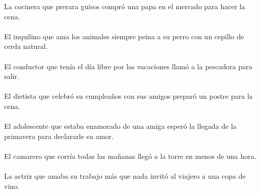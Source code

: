 La cocinera que prerara guisos compró una papa en el mercado para hacer la cena.	\\	\\
El inquilino que ama los animales siempre peina a su perro con un cepillo de cerda natural.	\\	\\
El conductor que tenía el día libre por las vacaciones llamó a la pescadora para salir.	\\	\\
El dietista que celebró su cumpleaños con sus amigos preparó un postre para la cena.	\\	\\
El adolescente que estaba enamorado de una amiga esperó la llegada de la primavera para declararle su amor.	\\	\\
El camarero que corría todas las mañanas llegó a la torre en menos de una hora.	\\	\\
La actriz que amaba su trabajo más que nada invitó al viajero a una copa de vino.	\\	\\

